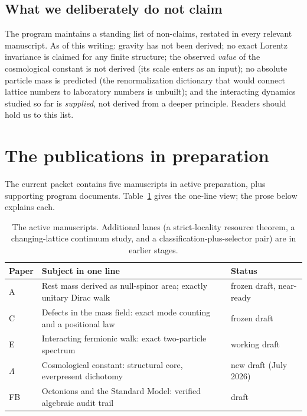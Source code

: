 \documentclass[11pt]{article}
\newcommand{\Lam}{\Lambda}
\begin{document}
\subsection{What we deliberately do not claim}

The program maintains a standing list of non-claims, restated in every
relevant manuscript.  As of this writing: gravity has not been derived;
no exact Lorentz invariance is claimed for any finite structure; the
observed \emph{value} of the cosmological constant is not derived (its
scale enters as an input); no absolute particle mass is predicted (the
renormalization dictionary that would connect lattice numbers to
laboratory numbers is unbuilt); and the interacting dynamics studied so
far is \emph{supplied}, not derived from a deeper principle.  Readers
should hold us to this list.

\section{The publications in preparation}\label{sec:papers}

The current packet contains five manuscripts in active preparation, plus
supporting program documents.  Table~\ref{tab:papers} gives the one-line
view; the prose below explains each.

\begin{table}[h]
\centering
\small
\begin{tabularx}{\textwidth}{@{}lXl@{}}
\toprule
Paper & Subject in one line & Status \\
\midrule
A & Rest mass derived as null-spinor area; exactly unitary Dirac walk & frozen draft, near-ready \\
C & Defects in the mass field: exact mode counting and a positional law & frozen draft \\
E & Interacting fermionic walk: exact two-particle spectrum & working draft \\
$\Lam$ & Cosmological constant: structural core, everpresent dichotomy & new draft (July 2026) \\
FB & Octonions and the Standard Model: verified algebraic audit trail & draft \\
\bottomrule
\end{tabularx}
\caption{The active manuscripts.  Additional lanes (a strict-locality
resource theorem, a changing-lattice continuum study, and a
classification-plus-selector pair) are in earlier stages.}
\label{tab:papers}
\end{table}
\end{document}
